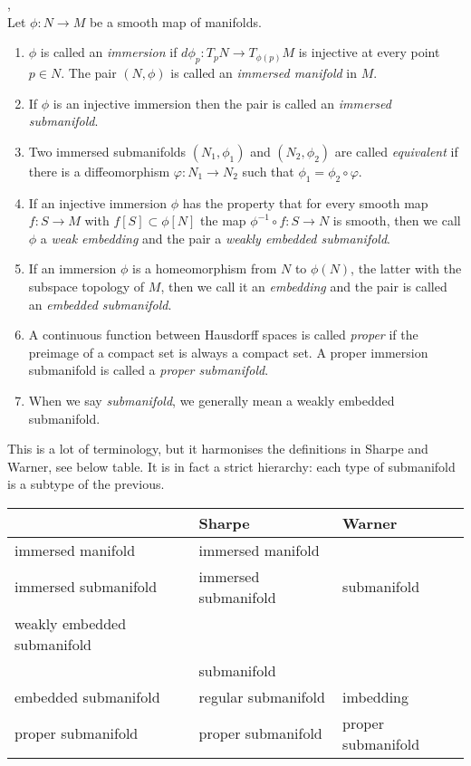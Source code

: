 \begin{definition}\textup{\cite[Def~1.27, Rem~1.33]{Warner1983},\cite[Defs~1.1.36,~1.1.40,~1.2.10,~1.2.21]{Sharpe1997}} \\
Let $\phi : N \to M$ be a smooth map of manifolds.
\begin{enumerate}
\item 
$\phi$ is called an \emph{immersion} if $d\phi_p : T_pN \to T_{\phi(p)}M$ is injective at every point $p \in N$.
The pair $(N,\phi)$ is called an \emph{immersed manifold} in $M$.
\item
If $\phi$ is an injective immersion then the pair is called an \emph{immersed submanifold}.
\item 
Two immersed submanifolds $(N_1,\phi_1)$ and $(N_2,\phi_2)$ are called \emph{equivalent} if there is a diffeomorphism $\varphi : N_1 \to N_2$ such that $\phi_1 = \phi_2 \circ \varphi$.
\item
If an injective immersion $\phi$ has the property that for every smooth map $f: S \to M$ with $f[S] \subset \phi[N]$ the map $\phi^{-1} \circ f : S \to N$ is smooth, then we call $\phi$ a \emph{weak embedding} and the pair a \emph{weakly embedded submanifold}.
\item
If an immersion $\phi$ is a homeomorphism from $N$ to $\phi(N)$, the latter with the subspace topology of $M$, then we call it an \emph{embedding} and the pair is called an \emph{embedded submanifold}.
\item
A continuous function between Hausdorff spaces is called \emph{proper} if the preimage of a compact set is always a compact set.
A proper immersion submanifold is called a \emph{proper submanifold}.
\item
When we say \emph{submanifold}, we generally mean a weakly embedded submanifold.
\end{enumerate}
\end{definition}

This is a lot of terminology, but it harmonises the definitions in Sharpe and Warner, see below table.
It is in fact a strict hierarchy: each type of submanifold is a subtype of the previous.

\begin{table}[h]
\begin{tabular}{l|l|l}
 & Sharpe & Warner \\ \hline
immersed manifold & immersed manifold & \\
immersed submanifold & immersed submanifold & submanifold \\
weakly embedded submanifold &  &  \\
 & submanifold &  \\
embedded submanifold & regular submanifold & imbedding \\
proper submanifold & proper submanifold & proper submanifold \\
\end{tabular}
\end{table}

